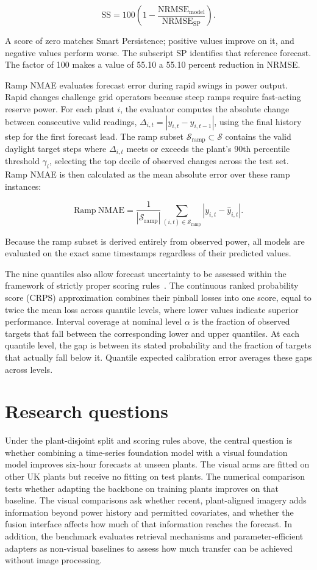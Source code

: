 \[
\mathrm{SS} = 100\left(1-\frac{\mathrm{NRMSE}_{\mathrm{model}}}{\mathrm{NRMSE}_{\mathrm{SP}}}\right).
\]

A score of zero matches Smart Persistence; positive values improve on it, and negative values perform worse. The subscript SP identifies that reference forecast. The factor of 100 makes a value of 55.10 a 55.10 percent reduction in NRMSE.

Ramp NMAE evaluates forecast error during rapid swings in power output. Rapid changes challenge grid operators because steep ramps require fast-acting reserve power. For each plant $i$, the evaluator computes the absolute change between consecutive valid readings, $\Delta_{i,t} = |y_{i,t} - y_{i,t-1}|$, using the final history step for the first forecast lead. The ramp subset $\mathcal{S}_{\mathrm{ramp}} \subset \mathcal{S}$ contains the valid daylight target steps where $\Delta_{i,t}$ meets or exceeds the plant's 90th percentile threshold $\gamma_i$, selecting the top decile of observed changes across the test set. Ramp NMAE is then calculated as the mean absolute error over these ramp instances:

\[
\mathrm{Ramp\ NMAE} = \frac{1}{|\mathcal{S}_{\mathrm{ramp}}|}\sum_{(i,t)\in\mathcal{S}_{\mathrm{ramp}}} |y_{i,t}-\hat{y}_{i,t}|.
\]

Because the ramp subset is derived entirely from observed power, all models are evaluated on the exact same timestamps regardless of their predicted values.

The nine quantiles also allow forecast uncertainty to be assessed within the framework of strictly proper scoring rules~\cite{gneiting}. The continuous ranked probability score (CRPS) approximation combines their pinball losses into one score, equal to twice the mean loss across quantile levels, where lower values indicate superior performance. Interval coverage at nominal level $\alpha$ is the fraction of observed targets that fall between the corresponding lower and upper quantiles. At each quantile level, the gap is between its stated probability and the fraction of targets that actually fall below it. Quantile expected calibration error averages these gaps across levels.

\section{Research questions}

Under the plant-disjoint split and scoring rules above, the central question is whether combining a time-series foundation model with a visual foundation model improves six-hour forecasts at unseen plants. The visual arms are fitted on other UK plants but receive no fitting on test plants. The numerical comparison tests whether adapting the backbone on training plants improves on that baseline. The visual comparisons ask whether recent, plant-aligned imagery adds information beyond power history and permitted covariates, and whether the fusion interface affects how much of that information reaches the forecast. In addition, the benchmark evaluates retrieval mechanisms and parameter-efficient adapters as non-visual baselines to assess how much transfer can be achieved without image processing.

